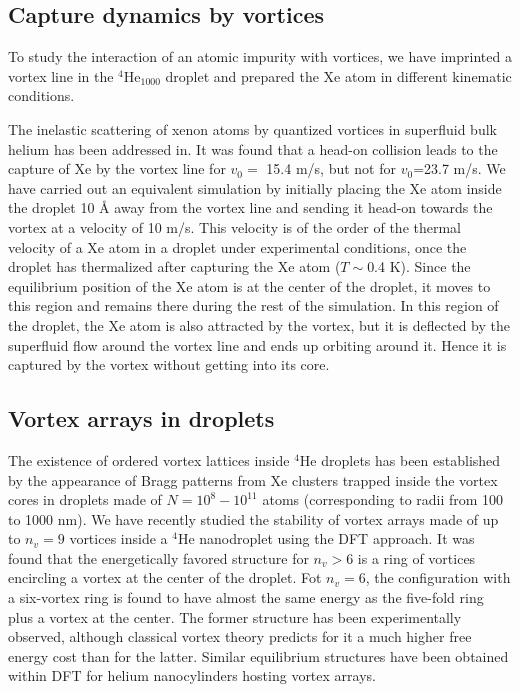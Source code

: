 	\subsection*{Capture dynamics by vortices}
	To study the interaction of an atomic impurity with vortices, 
we have imprinted a vortex line in the $^4$He$_{1000}$ droplet 
and prepared the Xe atom in different kinematic conditions. 
 
 The inelastic scattering of xenon atoms by quantized vortices in superfluid bulk helium has been addressed in.
 It was found that
 a head-on collision leads to the capture of Xe by the vortex line for $v_0=$ 15.4 m/s, but not for $v_0$=23.7 m/s.
We have carried out an equivalent simulation by initially placing
 the Xe atom inside the droplet 10 \AA{} away
from the vortex line and  sending it head-on towards the vortex at a velocity of 10 m/s.
This velocity is of the order of the thermal velocity of a Xe atom in a droplet under experimental conditions,
once the droplet has thermalized after capturing the Xe atom ($T \sim$0.4 K)\citep{Toe04}. 
Since the equilibrium position of the Xe atom is at the center of the droplet, it moves to this region and remains there during the rest of the simulation.
In this region of the droplet, the Xe atom is also attracted by the vortex, but it is deflected by the superfluid flow around the vortex line and ends up orbiting around it.
 Hence it is captured by the vortex without getting into its core.
 
 	\subsection*{Vortex arrays in droplets}
 	The existence of ordered vortex lattices inside $^4$He droplets has been established by the appearance of Bragg patterns from 
Xe clusters trapped inside the vortex cores in droplets made of $N= 10^8 - 10^{11}$ atoms
(corresponding to radii from 100 to 1000 nm)\citep{Gom14,Jones2016}. We have 
recently studied the stability of vortex 
arrays made of up to $n_v=9$ vortices
inside a $^4$He nanodroplet using the DFT approach\citep{Anc15}. 
It was found that 
the energetically favored structure for $n_v > 6$ is a ring 
of vortices encircling a vortex at the center of the droplet.
Fot $n_v=6$, the 
configuration with a six-vortex ring is found to have almost 
the same energy as the five-fold ring
plus a vortex at the center. The former structure 
has been experimentally observed\citep{Gom14,Jones2016,Ber17}, 
although classical vortex theory 
predicts for it a much higher free energy cost than for the latter\citep{Cam79}.
Similar equilibrium structures have been obtained within DFT for
helium nanocylinders hosting vortex arrays\citep{Anc14}.

